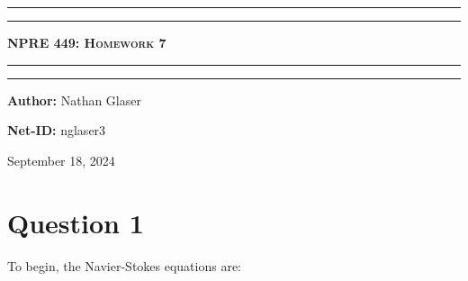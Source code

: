 \documentclass{article}
\begin{document}
\newcommand{\circled}[1]{\tikz[baseline=(char.base)]{
            \node[shape=circle,draw,inner sep=2pt] (char) {#1};}}
\begin{titlepage}

\centering
\scshape
\vspace{\baselineskip}

%
\rule{\textwidth}{1.6pt}\vspace*{-\baselineskip}\vspace*{2pt}
\rule{\textwidth}{0.4pt}

{\Huge \textbf{\textsc{NPRE 449: Homework 7 \\
\vspace{15pt}}}}

\rule{\textwidth}{0.4pt}\vspace*{-\baselineskip}\vspace{3.2pt}
\rule{\textwidth}{1.6pt}\vspace{6pt}
\vspace{1.5\baselineskip}


\large \centerline{\textbf{Author:} Nathan Glaser}
\large \centerline{\textbf{Net-ID:} nglaser3}
\quad

\vfill
\large \centerline{September 18, 2024}
%
\end{titlepage}

\tableofcontents
\newpage
{}

\newcommand{\leftrightharpoonup}{\mathrel{\mathpalette\lrhup\relax}}
\newcommand{\lrhup}[2]{\ooalign{$#1\leftharpoonup$\cr$#1\rightharpoonup$\cr}}
\newcommand{\pd}[3]{\frac{\partial^{#3}#1}{\partial#2^{#3}}}
\newcommand{\phase}{\left(\Vec{r},t\right)}
\newcommand*\vect[1]{\mkern2mu\accentset{\rightharpoonup}{#1}\mkern2mu}
\newcommand*\tensor[1]{\mkern2mu\accentset{\leftrightharpoonup}{#1}\mkern2mu}
\renewcommand{\Vec}[1]{\vect{#1}}
\newcommand{\stress}{\tensor{\mathbf{\tau}}}

\newcommand{\mass}{\pd{\rho}{t}{} + \nabla\cdot\rho\Vec{v} = 0}
\newcommand{\momentum}{\pd{\rho\Vec{v}}{t}{} + \nabla \cdot \rho\Vec{v}\Vec{v}=-\nabla P + \nabla \cdot \stress+\rho \Vec{g}}
\newcommand{\energy}{\pd{\rho u}{t}{} + \nabla\cdot\rho\Vec{v}u 
        =
        -\nabla\cdot q'' - P\nabla\cdot\Vec{v} + \stress\mathbf{:}\nabla\Vec{v}+q'''}
        
\section*{Question 1}
To begin, the Navier-Stokes equations are:
\end{document}
